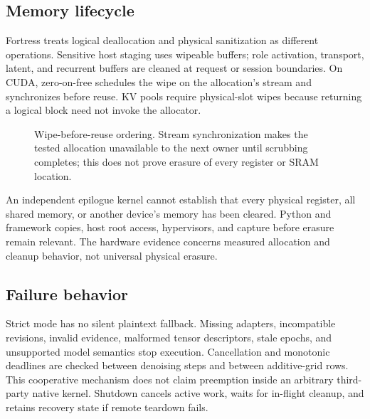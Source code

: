 \subsection{Memory lifecycle}

Fortress treats logical deallocation and physical sanitization as different operations. Sensitive host staging uses wipeable buffers; role activation, transport, latent, and recurrent buffers are cleaned at request or session boundaries. On CUDA, zero-on-free schedules the wipe on the allocation's stream and synchronizes before reuse. KV pools require physical-slot wipes because returning a logical block need not invoke the allocator.

\begin{figure}[htbp]
\centering

\caption{Wipe-before-reuse ordering. Stream synchronization makes the tested allocation unavailable to the next owner until scrubbing completes; this does not prove erasure of every register or SRAM location.}
\label{fig:memory}
\end{figure}

\begin{limitation}
An independent epilogue kernel cannot establish that every physical register, all shared memory, or another device's memory has been cleared. Python and framework copies, host root access, hypervisors, and capture before erasure remain relevant. The hardware evidence concerns measured allocation and cleanup behavior, not universal physical erasure.
\end{limitation}

\subsection{Failure behavior}

Strict mode has no silent plaintext fallback. Missing adapters, incompatible revisions, invalid evidence, malformed tensor descriptors, stale epochs, and unsupported model semantics stop execution. Cancellation and monotonic deadlines are checked between denoising steps and between additive-grid rows. This cooperative mechanism does not claim preemption inside an arbitrary third-party native kernel. Shutdown cancels active work, waits for in-flight cleanup, and retains recovery state if remote teardown fails.
